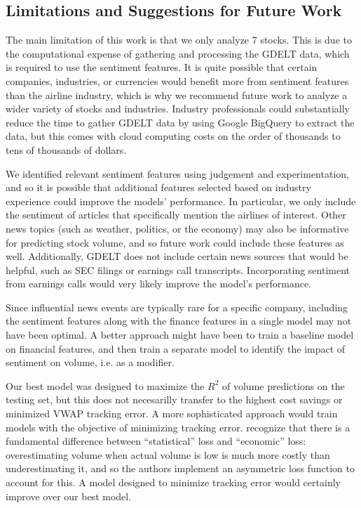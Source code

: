 \documentclass[12pt]{article}
\begin{document}
\subsection{Limitations and Suggestions for Future Work}
The main limitation of this work is that we only analyze 7 stocks. This is due to the computational expense of gathering and processing the GDELT data, which is required to use the sentiment features. It is quite possible that certain companies, industries, or currencies would benefit more from sentiment features than the airline industry, which is why we recommend future work to analyze a wider variety of stocks and industries. Industry professionals could substantially reduce the time to gather GDELT data by using Google BigQuery to extract the data, but this comes with cloud computing costs on the order of thousands to tens of thousands of dollars.

We identified relevant sentiment features using judgement and experimentation, and so it is possible that additional features selected based on industry experience could improve the models' performance. In particular, we only include the sentiment of articles that specifically mention the airlines of interest. Other news topics (such as weather, politics, or the economy) may also be informative for predicting stock volume, and so future work could include these features as well. Additionally, GDELT does not include certain news sources that would be helpful, such as SEC filings or earnings call transcripts. Incorporating sentiment from earnings calls would very likely improve the model's performance.

Since influential news events are typically rare for a specific company, including the sentiment features along with the finance features in a single model may not have been optimal. A better approach might have been to train a baseline model on financial features, and then train a separate model to identify the impact of sentiment on volume, i.e. as a modifier.

Our best model was designed to maximize the $R^2$ of volume predictions on the testing set, but this does not necesarilly transfer to the highest cost savings or minimized VWAP tracking error. A more sophisticated approach would train models with the objective of minimizing tracking error. \textcite{goyenko2024trading} recognize that there is a fundamental difference between ``statistical'' loss and ``economic'' loss: overestimating volume when actual volume is low is much more costly than underestimating it, and so the authors implement an asymmetric loss function to account for this. A model designed to minimize tracking error would certainly improve over our best model.
\end{document}
